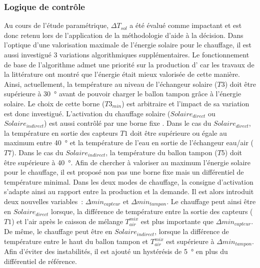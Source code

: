 \subsubsection{Logique de contrôle} %
\label{ssub:logique_de_controle}
Au cours de l’étude paramétrique, $\Delta T_{sol}$ a été évalué comme impactant et est
donc retenu lors de l’application de la méthodologie d’aide à la décision. Dans l’optique
d’une valorisation maximale de l’énergie solaire pour le chauffage, il est aussi
investigué $3$ variations algorithmiques supplémentaires. Le fonctionnement de base de
l’algorithme admet une priorité sur la production d’ car les travaux de la
littérature ont montré que l’énergie était mieux valorisée de cette manière. Ainsi,
actuellement, la température au niveau de l’échangeur solaire ($T3$) doit être supérieure
à \SI{30}{\degree} avant de pouvoir charger le ballon tampon grâce à l’énergie solaire. Le
choix de cette borne ($T3_{min}$) est arbitraire et l’impact de sa variation est donc
investigué. L’activation du chauffage solaire ($Solaire_{direct}$ ou $Solaire_{indirect}$)
est aussi contrôlé par une borne fixe . Dans le cas du
$Solaire_{direct}$, la température en sortie des capteurs $T1$ doit être supérieure ou
égale au maximum entre \SI{40}{\degree} et la température de l’eau en sortie de
l’échangeur eau/air ($T7$). Dans le cas du $Solaire_{indirect}$, la température du ballon
tampon ($T5$) doit être supérieure à \SI{40}{\degree}. Afin de chercher à valoriser au
maximum l’énergie solaire pour le chauffage, il est proposé non pas une borne fixe mais un
différentiel de température minimal. Dans les deux modes de chauffage, la consigne
d’activation s’adapte ainsi au rapport entre la production et la demande. Il est alors
introduit deux nouvelles variables~: $\Delta min_{capteur}$ et $\Delta min_{tampon}$. Le
chauffage peut ainsi être en $Solaire_{direct}$ lorsque, la différence de température
entre la sortie des capteurs ($T1$) et l’air après le caisson de mélange $T_{air}^{mix}$
est plus importante que $\Delta min_{capteur}$. De même, le chauffage peut être en
$Solaire_{indirect}$, lorsque la différence de température entre le haut du ballon tampon
et $T_{air}^{mix}$ est supérieure à $\Delta min_{tampon}$. Afin d’éviter des instabilités,
il est ajouté un hystérésis de \SI{5}{\degree} en plus du différentiel de référence.



